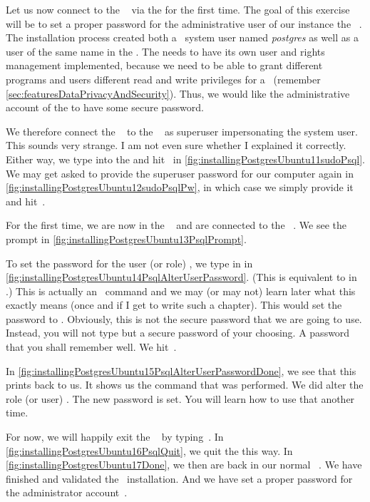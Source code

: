 Let us now connect to the \postgresql\  via the  for the first time.
The goal of this exercise will be to set a proper password for the administrative user of our instance the \postgresql\ .
The installation process created both a \linux\ system user named \textit{postgres} as well as a user of the same name in the .
The  needs to have its own user and rights management implemented, because we need to be able to grant different programs and users different read and write privileges for a ~(remember \cref{sec:featuresDataPrivacyAndSecurity}).
Thus, we would like the administrative account  of the  to have some secure password.

We therefore connect the \psql\  to the \postgresql\  as superuser impersonating the  system user.
This sounds very strange.
I am not even sure whether I explained it correctly.
Either way, we type  into the  and hit~\keys{\enter} in \cref{fig:installingPostgresUbuntu11sudoPsql}.
We may get asked to provide the superuser password for our computer again in \cref{fig:installingPostgresUbuntu12sudoPsqlPw}, in which case we simply provide it and hit~\keys{\enter}.

For the first time, we are now in the \psql\  and are connected to the \postgresql\ .
We see the prompt \expandafter{} in \cref{fig:installingPostgresUbuntu13PsqlPrompt}.%
%
\begin{sloppypar}%
To set the password for the user (or role) , we type in  in \cref{fig:installingPostgresUbuntu14PsqlAlterUserPassword}.
(This is equivalent to  in \postgresql.)
This is actually an \sql\ command and we may (or may not) learn later what this exactly means (once and if I get to write such a chapter).
This would set the password to .
Obviously, this is not the secure password that we are going to use.
Instead, you will not type  but a secure password of your choosing.
A password that you shall remember well.
We hit~\keys{\enter}.%
\end{sloppypar}%
%
In \cref{fig:installingPostgresUbuntu15PsqlAlterUserPasswordDone}, we see that this prints  back to us.
It shows us the command that was performed.
We did alter the role (or user) .
The new password is set.
You will learn how to use that another time.

For now, we will happily exit the \psql\  by typing~.
In \cref{fig:installingPostgresUbuntu16PsqlQuit}, we quit the  this way.
In \cref{fig:installingPostgresUbuntu17Done}, we then are back in our normal \bash\ .
We have finished and validated the \postgresql\ installation.
And we have set a proper password for the administrator account~.%
%
\FloatBarrier%
\endhsection%
%
